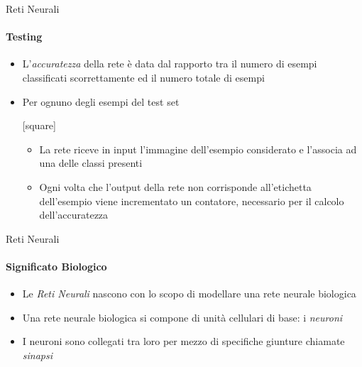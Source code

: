 \documentclass[
 ]{beamer}
\begin{document}
\begin{frame}{Reti Neurali}
    \framesubtitle{Testing}
    \begin{itemize} [<+->]
        \setlength\itemsep{2em}
        \item \large L'\emph{accuratezza} della rete è data dal rapporto tra il numero di esempi classificati scorrettamente ed il numero totale di esempi
        
        \item \large Per ognuno degli esempi del test set
        
        \bigskip
        
        [square] 
        \begin{itemize} 
        \setlength\itemsep{2em}
            \item \large La rete riceve in input l'immagine dell'esempio considerato e l'associa ad una delle classi presenti
            \item \large Ogni volta che l'output della rete non corrisponde all'etichetta dell'esempio viene incrementato un contatore, necessario per il calcolo dell'accuratezza
        \end{itemize}
    \end{itemize}
\end{frame}

\begin{frame}{Reti Neurali}
    \framesubtitle{Significato Biologico}
    \begin{itemize} [<+->]
        \setlength\itemsep{3em}
        \item \large Le \emph{Reti Neurali} nascono con lo scopo di modellare una rete neurale biologica
       \item \large Una rete neurale biologica si compone di unità cellulari di base: i \emph{neuroni}
       \item \large I neuroni sono collegati tra loro per mezzo di specifiche giunture chiamate \emph{sinapsi}
    \end{itemize}
\end{frame} 
\end{document}

